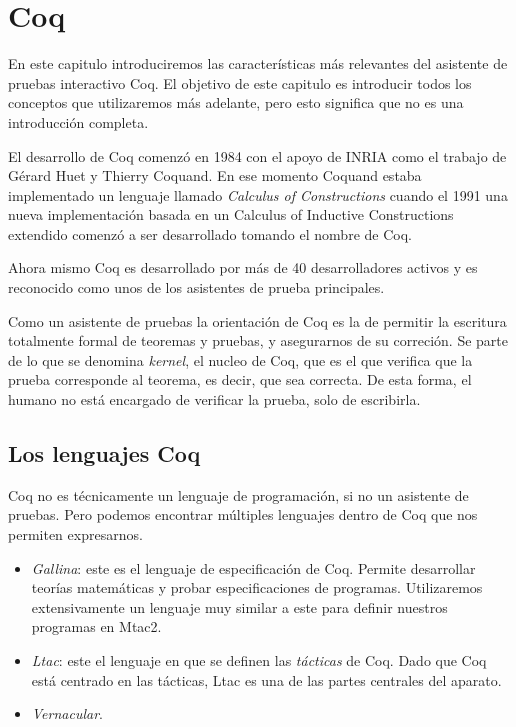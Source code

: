 \chapter{Coq}\label{ch:coq}
En este capitulo introduciremos las características más relevantes del asistente de pruebas interactivo Coq. El objetivo de este capitulo es introducir todos los conceptos que utilizaremos más adelante, pero esto significa que no es una introducción completa.

El desarrollo de Coq comenzó en 1984 con el apoyo de INRIA como el trabajo de Gérard Huet y Thierry Coquand. En ese momento Coquand estaba implementado un lenguaje llamado \textit{Calculus of Constructions} cuando el 1991 una nueva implementación basada en un Calculus of Inductive Constructions extendido comenzó a ser desarrollado tomando el nombre de Coq.

Ahora mismo Coq es desarrollado por más de 40 desarrolladores activos y es reconocido como unos de los asistentes de prueba principales.

Como un asistente de pruebas la orientación de Coq es la de permitir la escritura totalmente formal de teoremas y pruebas, y asegurarnos de su correción. Se parte de lo que se denomina \textit{kernel}, el nucleo de Coq, que es el que verifica que la prueba corresponde al teorema, es decir, que sea correcta. De esta forma, el humano no está encargado de verificar la prueba, solo de escribirla.

\section{Los lenguajes Coq}

Coq no es técnicamente un lenguaje de programación, si no un asistente de pruebas. Pero podemos encontrar múltiples lenguajes dentro de Coq que nos permiten expresarnos. 
\begin{itemize}
    \item \textit{Gallina}: este es el lenguaje de especificación de Coq. Permite desarrollar teorías matemáticas y probar especificaciones de programas. Utilizaremos extensivamente un lenguaje muy similar a este para definir nuestros programas en Mtac2.
    \item \textit{Ltac}: este el lenguaje en que se definen las \textit{tácticas} de Coq. Dado que Coq está centrado en las tácticas, Ltac es una de las partes centrales del aparato.
    \item \textit{Vernacular}.
\end{itemize}


